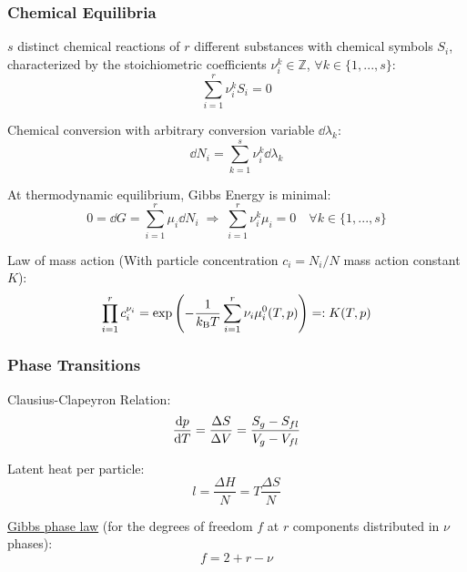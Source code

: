 		\subsubsection{Chemical Equilibria}
			\noindent
			$s$ distinct chemical reactions of $r$ different substances with chemical symbols $S_i$, characterized by the stoichiometric coefficients $\nu_i^k\in\mathbb{Z}$, $\forall k\in\lbrace1,...,s\rbrace$:
			\begin{equation}
				\sum_{i=1}^r \nu_i^k S_i = 0
			\end{equation}

			\noindent
			Chemical conversion with arbitrary conversion variable $\dd \lambda_k$:
			\begin{equation}
				\dd N_i = \sum_{k=1}^s \nu_i^k \dd \lambda_k
			\end{equation}

			\noindent
			At thermodynamic equilibrium, Gibbs Energy is minimal:
			\begin{equation}
					0 = \dd G = \sum_{i=1}^r \mu_i \dd N_i \;\Rightarrow\; \sum_{i=1}^r \nu_i^k \mu_i = 0 \quad\forall k\in\lbrace1,...,s\rbrace
			\end{equation}

			\noindent
			Law of mass action (With particle concentration $c_i = N_i/N$ mass action constant $K$):
			\begin{equation}
				\prod_{i=1}^r	c_i^{\nu_i} = \exp\left( -\frac{1}{k_{\text{B}} T}\sum_{i=1}^r \nu_i\mu_i^0(T,p) \right) =: K(T,p)
			\end{equation}

		\subsubsection{Phase Transitions}
			\noindent
			Clausius-Clapeyron Relation:
			\begin{equation}
				\dv{p}{T} = \frac{\Delta S}{\Delta V} = \frac{S_g - S_{fl}}{V_g - V_{fl}}
			\end{equation}

			\noindent
			Latent heat per particle:
			\begin{equation}
				l = \frac{\Delta H}{N} = T\frac{\Delta S}{N}
			\end{equation}

			\noindent
			\href{https://en.wikipedia.org/wiki/Phase_rule}{Gibbs phase law} (for the degrees of freedom $f$ at $r$ components distributed in $\nu$ phases):
			\begin{equation}
				f = 2 + r - \nu
			\end{equation}

